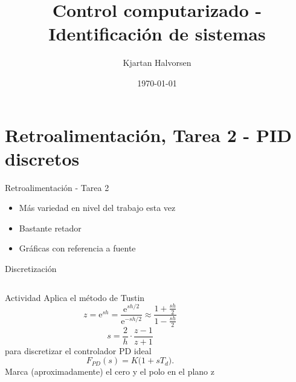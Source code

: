 \documentclass[presentation,aspectratio=169]{beamer}
\author{Kjartan Halvorsen}
\date{\today}
\title{Control computarizado - Identificación de sistemas}
\begin{document}
\maketitle

\section{Retroalimentación, Tarea 2 - PID discretos}
\label{sec:org9170d1d}

\begin{frame}[label={sec:org340d883}]{Retroalimentación -  Tarea 2}
\begin{itemize}
\item Más variedad en nivel del trabajo esta vez
\item Bastante retador
\item Gráficas con referencia a fuente
\end{itemize}
\end{frame}

\begin{frame}[label={sec:org18f94a3}]{Discretización}
\begin{columns}
\begin{column}{0.65\columnwidth}
\alert{Actividad} Aplica el método de Tustin
\[ z = \mathrm{e}^{sh} = \frac{\mathrm{e}^{sh/2}}{\mathrm{e}^{-sh/2}} \approx \frac{ 1 + \frac{sh}{2}}{1 - \frac{sh}{2}}\]
\[ s = \frac{2}{h} \cdot \frac{z-1}{z+1}\]
para discretizar el controlador PD ideal
\[F_{PD}(s) = K\big(1 + sT_d\big).\]
Marca (aproximadamente) el cero y el polo en el plano z 
\end{column}
\begin{column}{0.35\columnwidth}
\begin{center}
\end{center}
\end{column}
\end{columns}
\end{frame}
\end{document}
